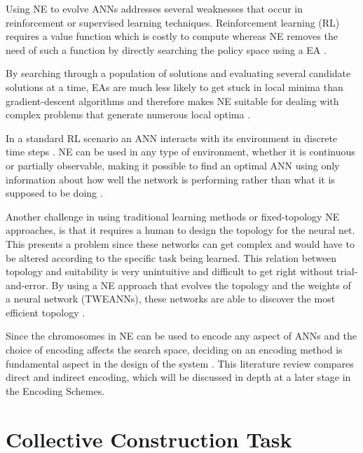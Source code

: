 Using NE to evolve ANNs addresses several weaknesses that occur in reinforcement or supervised learning techniques. Reinforcement learning (RL) requires a value function which is costly to compute whereas NE removes the need of such a function by directly searching the policy space using a EA \cite{RefWorks:32}.

By searching through a population of solutions and evaluating several candidate solutions at a time, EAs are much less likely to get stuck in local minima than gradient-descent algorithms and therefore makes NE suitable for dealing with complex problems that generate numerous local optima \cite{gomez2001neuro,RefWorks:1}.

In a standard RL scenario an ANN interacts with its environment in discrete time steps \cite{igel2003neuroevolution}. NE can be used in any type of environment, whether it is continuous or partially observable, making it possible to find an optimal ANN using only information about how well the network is performing rather than what it is supposed to be doing \cite{Miikkulainen:2010:ENN:1830761.1830902}.

Another challenge in using traditional learning methods or fixed-topology NE approaches, is that it requires a human to design the topology for the neural net. This presents a problem since these networks can get complex and would have to be altered according to the specific task being learned. This relation between topology and suitability is very unintuitive and difficult to get right without trial-and-error. By using a NE approach that evolves the topology and the weights of a neural network (TWEANNs), these networks are able to discover the most efficient topology \cite{RefWorks:31}.

Since the chromosomes in NE can be used to encode any aspect of ANNs and the choice of encoding affects the search space, deciding on an encoding method is fundamental aspect in the design of the system \cite{RefWorks:31}. This literature review compares direct and indirect encoding, which will be discussed in depth at a later stage in the Encoding Schemes.





\section{Collective Construction Task}

